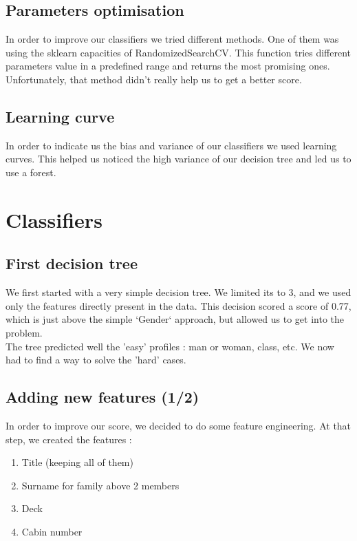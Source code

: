 \documentclass[a4paper,10pt]{report}
\begin{document}
\subsection{Parameters optimisation}
In order to improve our classifiers we tried different methods. One of them was using the sklearn 
capacities of RandomizedSearchCV. This function tries different parameters value in a predefined range 
and returns the most promising ones. Unfortunately, that method didn't really help us to get a better score.

\subsection{Learning curve}
In order to indicate us the bias and variance of our classifiers we used learning curves. This helped us 
noticed the high variance of our decision tree and led us to use a forest.


\section{Classifiers}
\subsection{First decision tree}
We first started with a very simple decision tree. We limited its to 3, and we used only the features directly present
in the data. This decision scored a score of 0.77, which is just above the simple `Gender` approach, but allowed us to 
get into the problem. \\
The tree predicted well the 'easy' profiles : man or woman, class, etc. We now had to find a way to solve the 'hard' cases. 

\subsection{Adding new features (1/2)}
In order to improve our score, we decided to do some feature engineering. At that step, we created the features :




\begin{enumerate}
 \item Title (keeping all of them)
 \item Surname for family above 2 members
 \item Deck
 \item Cabin number
\end{enumerate}
\end{document}

